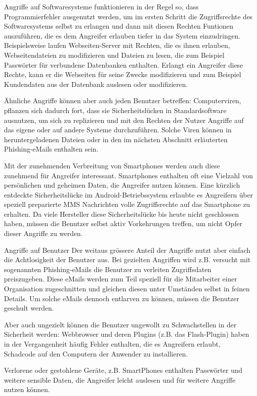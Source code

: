 \documentclass[final]{beamer}
\newlength{\twocolwid}
\begin{document}
\begin{frame}[t]
\begin{columns}[t, totalwidth=\textwidth]
\begin{column}{\twocolwid} %

\begin{block}{}
Angriffe auf Softwaresysteme funktionieren in der Regel so, dass Programmierfehler ausgenutzt 
werden, um im ersten Schritt die Zugriffsrechte des Softwaresystems selbst zu erlangen und
dann mit diesen Rechten Funtionen auszuführen, die es dem Angreifer erlauben tiefer in das 
System einzudringen. Beispielsweise laufen Webseiten-Server mit Rechten, die es ihnen erlauben,
Webseitendateien zu modifizieren und Dateien zu lesen, die zum Beispiel Passwörter für 
verbundene Datenbanken enthalten. Erlangt ein Angreifer diese Rechte, kann er die Webseiten
für seine Zwecke modifizieren und zum Beispiel Kundendaten aus der Datenbank auslesen oder
modifizieren.
\par
Ähnliche Angriffe können aber auch jeden Benutzer betreffen: Computerviren, pflanzen sich dadurch
fort, dass sie Sicherheitslücken in Standardsoftware ausnutzen, um sich zu replizieren und mit den
Rechten der Nutzer Angriffe auf das eigene oder auf andere Systeme durchzuführen. Solche Viren
können in heruntergeladenen Dateien oder in den im nächsten Abschnitt erläuterten Phishing-eMails
enthalten sein. 
\par
Mit der zunehmenden Verbreitung von Smartphones werden auch diese zunehmend für Angreifer 
interessant. Smartphones enthalten oft eine Vielzahl von persönlichen und geheimen Daten, die 
Angreifer nutzen können. Eine kürzlich entdeckte Sicherheitslücke im Android-Betriebssystem erlaubte 
es Angreifern über speziell preparierte MMS Nachrichten volle Zugriffsrechte auf das Smartphone 
zu erhalten. Da viele Hersteller diese Sicherheitslücke bis heute nicht geschlossen haben, müssen
die Benutzer selbst aktiv Vorkehrungen treffen, um nicht Opfer dieser Angriffe zu werden.
\end{block}

\begin{block}{Angriffe auf Benutzer}
 Der weitaus grössere Anteil der Angriffe nutzt aber einfach die Achtlosigkeit der Benutzer aus. 
 Bei gezielten Angriffen wird z.B. versucht mit sogenannten Phishing-eMails die Benutzer zu verleiten
 Zugriffsdaten preiszugeben. Diese eMails werden zum Teil speziell für die Mitarbeiter einer Organisation 
 zugeschnitten und gleichen diesen unter Umständen selbst in feinen Details. Um solche eMails 
 dennoch entlarven zu können, müssen die Benutzer geschult werden.
 \par
 Aber auch ungezielt können die Benutzer ungewollt zu Schwachstellen in der Sicherheit werden:
 Webbrowser und deren Plugins (z.B. das Flash-Plugin) haben in der Vergangenheit häufig
 Fehler enthalten, die es Angreifern erlaubt, Schadcode auf den Computern der Anwender zu 
 installieren.
 \par
 Verlorene oder gestohlene Geräte, z.B. SmartPhones enthalten Passwörter und weitere sensible 
 Daten, die Angreifer leicht auslesen und für weitere Angriffe nutzen können.
\end{block}


\end{column}
\end{columns}
\end{frame}
\end{document}

